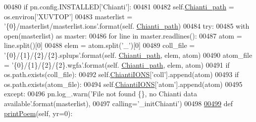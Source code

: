 \begin{DoxyCode}
00480         \textcolor{keywordflow}{if} pn.config.INSTALLED[\textcolor{stringliteral}{'Chianti'}]:
00481     
00482             self.\hyperlink{classpyneb_1_1utils_1_1manage__atomic__data_1_1___manage_atomic_data_a898e51085e3461333ea9df3a3fce3599}{Chianti\_path} = os.environ[\textcolor{stringliteral}{'XUVTOP'}]
00483             masterlist = \textcolor{stringliteral}{'\{0\}/masterlist/masterlist.ions'}.format(self.
      \hyperlink{classpyneb_1_1utils_1_1manage__atomic__data_1_1___manage_atomic_data_a898e51085e3461333ea9df3a3fce3599}{Chianti\_path})
00484             \textcolor{keywordflow}{try}:
00485                 with open(masterlist) \textcolor{keyword}{as} master:
00486                     \textcolor{keywordflow}{for} line \textcolor{keywordflow}{in} master.readlines():
00487                         atom = line.split()[0]
00488                         elem = atom.split(\textcolor{stringliteral}{'\_'})[0]
00489                         coll\_file = \textcolor{stringliteral}{'\{0\}/\{1\}/\{2\}/\{2\}.splups'}.format(self.
      \hyperlink{classpyneb_1_1utils_1_1manage__atomic__data_1_1___manage_atomic_data_a898e51085e3461333ea9df3a3fce3599}{Chianti\_path}, elem, atom)
00490                         atom\_file = \textcolor{stringliteral}{'\{0\}/\{1\}/\{2\}/\{2\}.wgfa'}.format(self.
      \hyperlink{classpyneb_1_1utils_1_1manage__atomic__data_1_1___manage_atomic_data_a898e51085e3461333ea9df3a3fce3599}{Chianti\_path}, elem, atom)
00491                         \textcolor{keywordflow}{if} os.path.exists(coll\_file): 
00492                             self.\hyperlink{classpyneb_1_1utils_1_1manage__atomic__data_1_1___manage_atomic_data_a06491f5f808df3d4e58b35e09db74a18}{ChiantiIONS}[\textcolor{stringliteral}{'coll'}].append(atom)
00493                         \textcolor{keywordflow}{if} os.path.exists(atom\_file):
00494                             self.\hyperlink{classpyneb_1_1utils_1_1manage__atomic__data_1_1___manage_atomic_data_a06491f5f808df3d4e58b35e09db74a18}{ChiantiIONS}[\textcolor{stringliteral}{'atom'}].append(atom)
00495             \textcolor{keywordflow}{except}:
00496                 pn.log\_.warn(\textcolor{stringliteral}{'File not found \{\}, no Chianti data available'}.format(masterlist), 
00497                              calling=\textcolor{stringliteral}{'\_initChianti'})
00498         
\hypertarget{manage__atomic__data_8py_source_l00499}{}\hyperlink{classpyneb_1_1utils_1_1manage__atomic__data_1_1___manage_atomic_data_a780a8f85e8acf64b44b2bce4b4292386}{00499}     \textcolor{keyword}{def }\hyperlink{classpyneb_1_1utils_1_1manage__atomic__data_1_1___manage_atomic_data_a780a8f85e8acf64b44b2bce4b4292386}{printPoem}(self, yr=0):

\end{DoxyCode}
